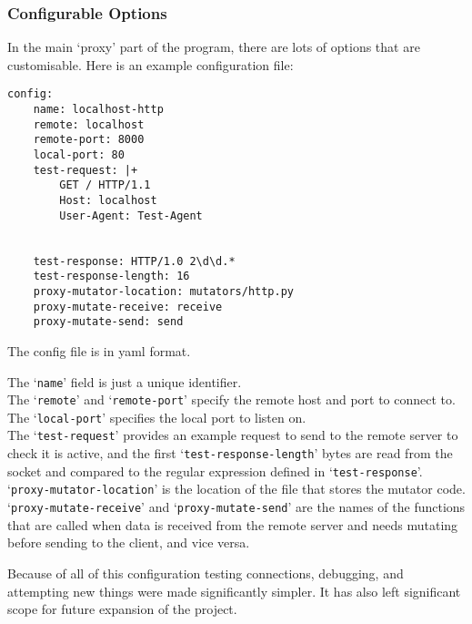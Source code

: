 \subsubsection{Configurable Options}
In the main `proxy' part of the program, there are lots of options that are customisable.
Here is an example configuration file:
\begin{verbatim}
config:
    name: localhost-http
    remote: localhost
    remote-port: 8000
    local-port: 80
    test-request: |+
        GET / HTTP/1.1
        Host: localhost
        User-Agent: Test-Agent


    test-response: HTTP/1.0 2\d\d.*
    test-response-length: 16
    proxy-mutator-location: mutators/http.py
    proxy-mutate-receive: receive
    proxy-mutate-send: send
\end{verbatim}
The config file is in yaml format.\par
The `\texttt{name}' field is just a unique identifier.\\
The `\texttt{remote}' and `\texttt{remote-port}' specify the remote host and port to connect to.\\
The `\texttt{local-port}' specifies the local port to listen on.\\
The `\texttt{test-request}' provides an example request to send to the remote server to check it is active, and the first `\texttt{test-response-length}' bytes are read from the socket and compared to the regular expression defined in `\texttt{test-response}'.\\
`\texttt{proxy-mutator-location}' is the location of the file that stores the mutator code.
`\texttt{proxy-mutate-receive}' and `\texttt{proxy-mutate-send}' are the names of the functions that are called when data is received from the remote server and needs mutating before sending to the client, and vice versa.\par
Because of all of this configuration testing connections, debugging, and attempting new things were made significantly simpler. It has also left significant scope for future expansion of the project.


